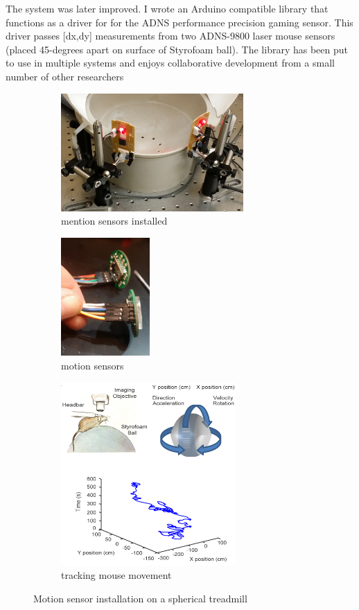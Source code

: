 The system was later improved.
I wrote an Arduino compatible library that functions as a driver for for the ADNS performance precision gaming sensor.
This driver passes {[}dx,dy{]} measurements from two ADNS-9800 laser mouse sensors (placed 45-degrees apart on surface of Styrofoam ball).
The library has been put to use in multiple systems and enjoys collaborative development from a small number of other researchers \cite{Romano_2019}

\begin{figure}[htb]
	\begin{subfigure}[t]{0.45\linewidth}\centering
		\includegraphics[height=4.5cm]{figures/01-motion-sensors-installed.jpg}
        \caption{mention sensors installed}
	\end{subfigure}
	\hfill
	\begin{subfigure}[t]{0.45\linewidth}\centering
		\includegraphics[height=4.5cm]{figures/02-motion-sensors.jpg}
        \caption{motion sensors}
	\end{subfigure}
	\begin{subfigure}[t]{\linewidth}\centering
		\includegraphics[height=7cm]{figures/striatum_figure2.png}
        \caption{tracking mouse movement}
	\end{subfigure}
	\caption{Motion sensor installation on a spherical treadmill}
	\label{fig:motion-sensors-on-spherical-treadmill}
\end{figure}

